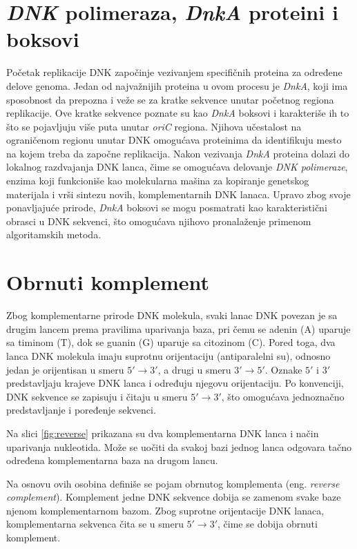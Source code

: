 \documentclass[12pt,oneside]{memoir}
\begin{document}
\section{\textit{DNK} polimeraza, \textit{DnkA} proteini i boksovi}
Početak replikacije DNK započinje vezivanjem specifičnih proteina za određene delove genoma. Jedan od najvažnijih proteina u ovom procesu je \textit{DnkA}, koji ima sposobnost da prepozna i veže se za kratke sekvence unutar početnog regiona replikacije. Ove kratke sekvence poznate su kao \textit{DnkA} boksovi i karakteriše ih to što se pojavljuju više puta unutar \textit{oriC} regiona. Njihova učestalost na ograničenom regionu unutar DNK omogućava proteinima da identifikuju mesto na kojem treba da započne replikacija.
Nakon vezivanja \textit{DnkA} proteina dolazi do lokalnog razdvajanja DNK lanca, čime se omogućava delovanje \textit{DNK polimeraze}, enzima koji funkcioniše kao molekularna mašina za kopiranje genetskog materijala i vrši sintezu novih, komplementarnih DNK lanaca.
Upravo zbog svoje ponavljajuće prirode, \textit{DnkA} boksovi se mogu posmatrati kao karakteristični obrasci u DNK sekvenci, što omogućava njihovo pronalaženje primenom algoritamskih metoda. 




\section{Obrnuti komplement}

Zbog komplementarne prirode DNK molekula, svaki lanac DNK povezan je sa drugim lancem prema pravilima uparivanja baza, pri čemu se adenin (A) uparuje sa timinom (T), dok se guanin (G) uparuje sa citozinom (C). Pored toga, dva lanca DNK molekula imaju suprotnu orijentaciju (antiparalelni su), odnosno jedan je orijentisan u smeru $5' \rightarrow 3'$, a drugi u smeru $3' \rightarrow 5'$. Oznake $5'$ i $3'$ predstavljaju krajeve DNK lanca i određuju njegovu orijentaciju. Po konvenciji, DNK sekvence se zapisuju i čitaju u smeru $5' \rightarrow 3'$, što omogućava jednoznačno predstavljanje i poređenje sekvenci.

Na slici \ref{fig:reverse} prikazana su dva komplementarna DNK lanca i način uparivanja nukleotida. Može se uočiti da svakoj bazi jednog lanca odgovara tačno određena komplementarna baza na drugom lancu.

Na osnovu ovih osobina definiše se pojam obrnutog komplementa (eng. \textit{reverse complement}). Komplement jedne DNK sekvence dobija se zamenom svake baze njenom komplementarnom bazom. Zbog suprotne orijentacije DNK lanaca, komplementarna sekvenca čita se u smeru $5' \rightarrow 3'$, čime se dobija obrnuti komplement.
\end{document}
